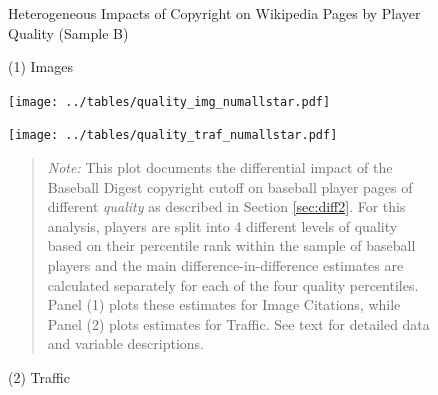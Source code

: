 \begin{figure}[!htbp]
\begin{center}
\caption{Heterogeneous Impacts of Copyright on Wikipedia Pages by Player Quality (Sample B)}
\label{fig:quality}
\vspace{5mm}
\caption*{\small{(1) Images}}
\texttt{[image: ../tables/quality\_img\_numallstar.pdf]}\\
\vspace{5mm}
\caption*{\small{(2) Traffic}}
\texttt{[image: ../tables/quality\_traf\_numallstar.pdf]}

\end{center}
\begin{quote}
\emph{Note:} This plot documents the differential impact of the Baseball Digest copyright cutoff on baseball player pages of different \emph{quality} as described in Section \ref{sec:diff2}. For this analysis, players are split into 4 different levels of quality based on their percentile rank within the sample of baseball players and the main difference-in-difference estimates are calculated separately for each of the four quality percentiles. Panel (1) plots these estimates for Image Citations, while Panel (2) plots estimates for Traffic. See text for detailed data and variable descriptions.




\end{quote}
\end{figure}



\appendix

\setcounter{table}{0}
\setcounter{figure}{0}

